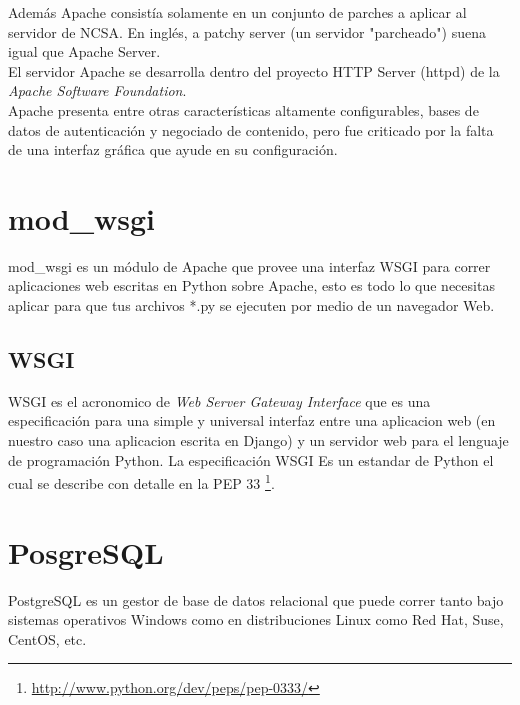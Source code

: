 Además Apache consistía solamente en un conjunto de parches a aplicar al servidor de NCSA. En inglés, a patchy server (un servidor "parcheado") suena igual que  Apache Server. \\[0.1cm]

El servidor Apache se desarrolla dentro del proyecto HTTP Server (httpd) de la \textit{Apache Software Foundation}.\\[0.1cm]

Apache presenta entre otras características altamente configurables, bases de datos de autenticación y negociado de contenido, pero fue criticado por la falta de una interfaz gráfica que ayude en su configuración.\\[0.2cm]


\section{mod\_wsgi}

mod\_wsgi es un módulo de Apache que provee una interfaz WSGI para correr aplicaciones web escritas en Python sobre Apache, esto es todo lo que necesitas aplicar para que tus  archivos *.py se ejecuten por medio de un navegador Web.\\[0.1cm]
 

\subsection{WSGI}

WSGI es el acronomico de \textit{Web Server Gateway Interface} que es una especificación para una simple y universal interfaz entre una aplicacion web (en nuestro caso una aplicacion escrita en Django) y un servidor web para el lenguaje de programación Python.  La especificación WSGI Es un estandar de Python el cual se describe con detalle en la PEP 33 \footnote{\url{http://www.python.org/dev/peps/pep-0333/}}.\\[0.1cm]



\section{PosgreSQL}

PostgreSQL es un gestor de base de datos relacional que puede correr tanto bajo sistemas operativos Windows como en distribuciones Linux como Red Hat, Suse, CentOS, etc.\\[0.1cm]

